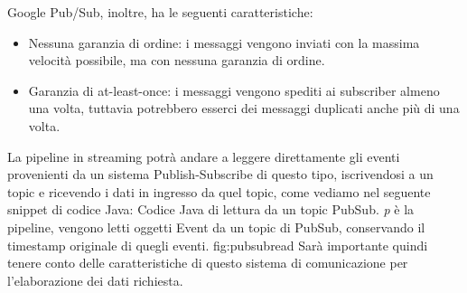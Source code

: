 Google Pub/Sub, inoltre, ha le seguenti caratteristiche:
\begin{itemize}
\item Nessuna garanzia di ordine: i messaggi vengono inviati con la massima velocità possibile, ma con nessuna garanzia di ordine.
\item Garanzia di at-least-once: i messaggi vengono spediti ai subscriber almeno una volta, tuttavia potrebbero esserci dei messaggi duplicati  anche più di una volta.
\end{itemize}
La pipeline in streaming potrà andare a leggere direttamente gli eventi provenienti da un sistema Publish-Subscribe di questo tipo, iscrivendosi a un topic e ricevendo i dati in ingresso da quel topic, come vediamo nel seguente snippet di codice Java:
{Codice Java di lettura da un topic PubSub. \textit{p} è la pipeline, vengono letti oggetti Event da un topic di PubSub, conservando il timestamp originale di quegli eventi.}
{fig:pubsubread}
Sarà importante quindi tenere conto delle caratteristiche di questo sistema di comunicazione per l’elaborazione dei dati richiesta.
